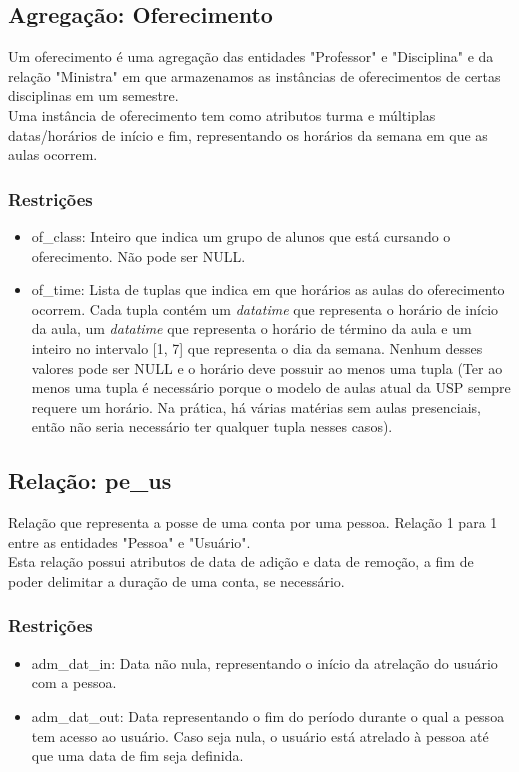 \documentclass{article}
\begin{document}
  	\subsection{Agregação: Oferecimento}
  	    \quad Um oferecimento é uma agregação das entidades "Professor" e "Disciplina" e da relação "Ministra" em que armazenamos as instâncias de oferecimentos de certas disciplinas em um semestre. \\
  	    \null \quad Uma instância de oferecimento tem como atributos turma e múltiplas datas/horários de início e fim, representando os horários da semana em que as aulas ocorrem. 
  	    \subsubsection{Restrições}
  	        \begin{itemize}
  	            \item of\_class: Inteiro que indica um grupo de alunos que está cursando o oferecimento. Não pode ser NULL.
  	            \item of\_time: Lista de tuplas que indica em que horários as aulas do oferecimento ocorrem. Cada tupla contém um \textit{datatime} que representa o horário de início da aula, um \textit{datatime} que representa o horário de término da aula e um inteiro no intervalo [1, 7] que representa o dia da semana. Nenhum desses valores pode ser NULL e o horário deve possuir ao menos uma tupla (Ter ao menos uma tupla é necessário porque o modelo de aulas atual da USP sempre requere um horário. Na prática, há várias matérias sem aulas presenciais, então não seria necessário ter qualquer tupla nesses casos).
  	         \end{itemize}
  	    
  	\subsection{Relação: pe\_us}
  	    \quad Relação que representa a posse de uma conta por uma pessoa. Relação 1 para 1 entre as entidades "Pessoa" e "Usuário". \\
  	    \null \quad Esta relação possui atributos de data de adição e data de remoção, a fim de poder delimitar a duração de uma conta, se necessário.
  	    \subsubsection{Restrições}
  	        \begin{itemize}
  	            \item adm\_dat\_in: Data não nula, representando o início da atrelação do usuário com a pessoa.
  	            \item adm\_dat\_out: Data representando o fim do período durante o qual a pessoa tem acesso ao usuário. Caso seja nula, o usuário está atrelado à pessoa até que uma data de fim seja definida.
  	        \end{itemize}
  	    
\end{document}
